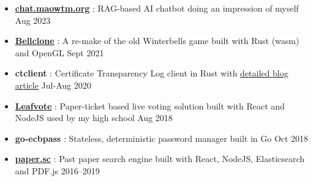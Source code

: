   \begin{itemize}
    \item \href{https://chat.maowtm.org}{\textbf{\color{link}chat.maowtm.org}} : RAG-based AI chatbot doing an impression of myself \dashdiv{} Aug 2023



    \item \href{https://bellclone.maowtm.org/}{\color{link}\textbf{Bellclone}} : A re-make of the old Winterbells game built with Rust (wasm) and OpenGL \dashdiv{} Sept 2021

    \item \textbf{ctclient} : Certificate Transparency Log client in Rust with \href{https://blog.maowtm.org/ct/en.html}{\color{link}detailed blog article} \dashdiv{} Jul-Aug 2020

    \item \href{https://leafvote.mww.moe}{\color{link}\textbf{Leafvote}} : Paper-ticket based live voting solution built with React and NodeJS used by my high school \dashdiv{} Aug 2018


    \item \textbf{go-ecbpass} : Stateless, deterministic password manager built in Go \dashdiv{} Oct 2018

    \item \href{https://paper.sc}{\color{link}\textbf{paper.sc}} : Past paper search engine built with React, NodeJS, Elasticsearch and PDF.js \dashdiv{} 2016--2019


\end{itemize}
